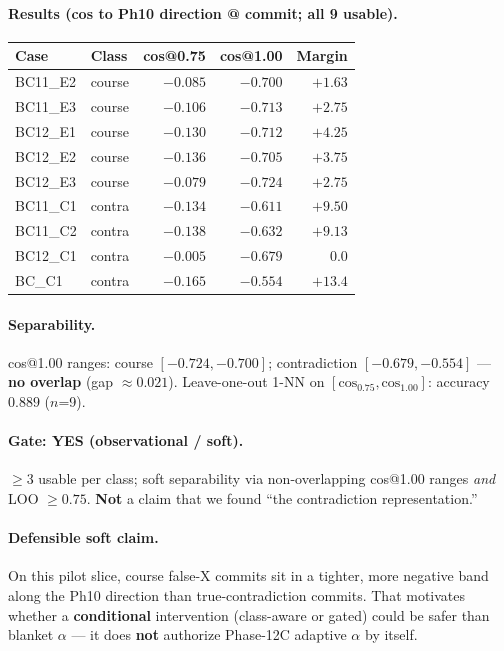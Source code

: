 \documentclass[11pt,a4paper]{article}
\begin{document}
\paragraph{Results (cos to Ph10 direction @ commit; all 9 usable).}
\begin{center}
\small
\begin{tabular}{llrrr}
\toprule
Case & Class & cos@0.75 & cos@1.00 & Margin \\
\midrule
BC11\_E2 & course & $-0.085$ & $-0.700$ & $+1.63$ \\
BC11\_E3 & course & $-0.106$ & $-0.713$ & $+2.75$ \\
BC12\_E1 & course & $-0.130$ & $-0.712$ & $+4.25$ \\
BC12\_E2 & course & $-0.136$ & $-0.705$ & $+3.75$ \\
BC12\_E3 & course & $-0.079$ & $-0.724$ & $+2.75$ \\
BC11\_C1 & contra & $-0.134$ & $-0.611$ & $+9.50$ \\
BC11\_C2 & contra & $-0.138$ & $-0.632$ & $+9.13$ \\
BC12\_C1 & contra & $-0.005$ & $-0.679$ & $0.0$ \\
BC\_C1 & contra & $-0.165$ & $-0.554$ & $+13.4$ \\
\bottomrule
\end{tabular}
\end{center}

\paragraph{Separability.}
cos@1.00 ranges: course $[{-}0.724,{-}0.700]$; contradiction $[{-}0.679,{-}0.554]$ --- \textbf{no overlap} (gap $\approx 0.021$).
Leave-one-out 1-NN on $[\mathrm{cos}_{0.75},\mathrm{cos}_{1.00}]$: accuracy $0.889$ ($n$=9).

\paragraph{Gate: YES (observational / soft).}
$\geq$3 usable per class; soft separability via non-overlapping cos@1.00 ranges \emph{and} LOO $\geq 0.75$.
\textbf{Not} a claim that we found ``the contradiction representation.''

\paragraph{Defensible soft claim.}
On this pilot slice, course false-X commits sit in a tighter, more negative band along the Ph10 direction than true-contradiction commits. That motivates whether a \textbf{conditional} intervention (class-aware or gated) could be safer than blanket $\alpha$ --- it does \textbf{not} authorize Phase-12C adaptive $\alpha$ by itself.
\end{document}
